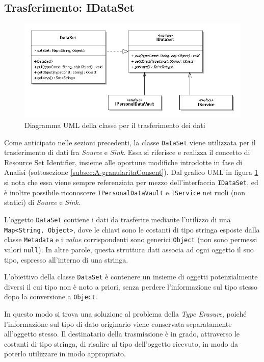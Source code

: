 \subsection{Trasferimento: IDataSet}
\begin{figure} [h]
	\includegraphics[width=\linewidth]{pictures/IDataSet.png}
	\caption{Diagramma UML della classe per il trasferimento dei dati}
	\label{fig:IDataSet}
\end{figure}
Come anticipato nelle sezioni precedenti, la classe \texttt{DataSet} viene utilizzata per il trasferimento di dati fra \textit{Source} e \textit{Sink}. Essa si riferisce e realizza il concetto di Resource Set Identifier, insieme alle oportune modifiche introdotte in fase di Analisi (sottosezione \ref{subsec:A-granularitaConsent}).
 Dal grafico UML in figura \ref{fig:IDataSet} si nota che essa viene sempre referenziata per mezzo dell’interfaccia \texttt{IDataSet}, ed \`e inoltre possibile riconoscere \texttt{IPersonalDataVault} e \texttt{IService} nei ruoli (non statici) di \textit{Source} e \textit{Sink}.

L’oggetto \texttt{DataSet} contiene i dati da trasferire mediante l’utilizzo di una \texttt{Map<String, Object>}, dove le chiavi sono le costanti di tipo stringa esposte dalla classe \texttt{Metadata} e i \textit{value} corrispondenti sono generici \texttt{Object} (non sono permessi valori \texttt{null}). In altre parole, questa struttura dati associa ad ogni oggetto il suo tipo, espresso all’interno di una stringa.

L’obiettivo della classe \texttt{DataSet} \`e contenere un insieme di oggetti potenzialmente diversi il cui tipo non \`e noto a priori, senza perdere l’informazione sul tipo stesso dopo la conversione a \texttt{Object}.

In questo modo si trova una soluzione al problema della \textit{Type Erasure}, poich\'e l’informazione sul tipo di dato originario viene conservata separatamente all’oggetto stesso. Il destinatario della trasmissione \`e in grado, attraverso le costanti di tipo stringa, di risalire al tipo dell’oggetto ricevuto, in modo da poterlo utilizzare in modo appropriato.

